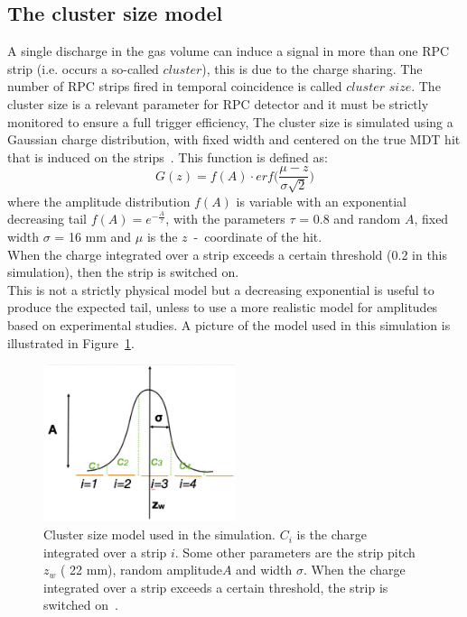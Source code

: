 \subsection{The cluster size model}
\label{sec:CSM}
A single discharge in the gas volume can induce a signal in more than
one RPC strip (i.e. occurs a so-called $cluster$), this is due to the charge sharing.
The number of RPC strips fired in temporal coincidence is called $cluster$ $size$. 
The cluster size is a relevant parameter for RPC detector and it must be strictly monitored to 
ensure a full trigger efficiency,
The cluster size is simulated using a Gaussian charge distribution, with fixed width and centered on the true MDT hit that is induced on the strips~\cite{MuonWeek22Oct}. 
This function is defined as:
\begin{equation}
G(z)=f(A)\cdot erf \bigg(\frac{\mu-z}{\sigma\sqrt{2}}\bigg)
\end{equation}
where the amplitude distribution $f(A)$ is variable with an exponential decreasing tail $f(A)=e^{-\frac{A}{\tau}}$, with the parameters $\tau$ = 0.8 and random $A$, fixed width $\sigma$ = 16 mm and $\mu$ is the $z$~-~coordinate of the hit.\\
When the charge integrated over a strip exceeds a certain threshold (0.2 in this simulation), then the strip is switched on.\\
This is not a strictly physical model but a decreasing exponential is useful to produce the expected tail, unless to use a more realistic model for amplitudes
based on experimental studies. A picture of the model used in this simulation is illustrated in Figure~\ref{fig:csm_pic}.
\begin{figure}[!h]
	\centering
	\includegraphics[width=0.5\textwidth]{Chapters/CH3/figures/csm_pic}
	\caption{Cluster size model used in the simulation. $C_i$ is the charge integrated over a strip $i$. 
		Some other parameters are the strip pitch $z_w$ ( 22 mm), random amplitude$A$ and width $\sigma$. When the charge integrated over a strip exceeds a certain threshold, the strip is switched on~\cite{MuonWeek22Oct}.}
	\label{fig:csm_pic}
\end{figure}
